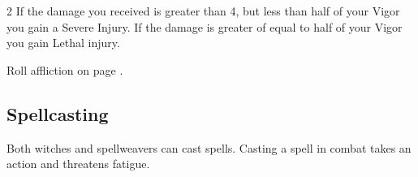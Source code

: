 \begin{multicols*}{2}
If the damage you received is greater than 4, but less than half of your Vigor you gain a Severe Injury. 
If the damage is greater of equal to half of your Vigor you gain Lethal injury. 

Roll affliction on page \pageref*{sec:injuries}.

\subsection*{Spellcasting}

Both witches and spellweavers can cast spells. Casting a spell in combat takes an action and threatens fatigue.

\end{multicols*}